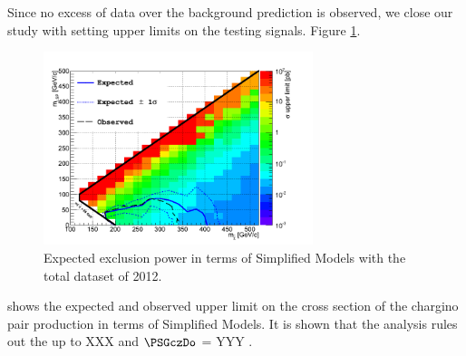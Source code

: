 Since no excess of data over the background prediction is observed, 
we close our study with setting upper limits on the testing signals.
Figure \ref{fig:limit_final}. 
\begin{linenomath}
\begin{figure}[h]
\centering
\includegraphics[width=0.7\textwidth,keepaspectratio=true]{StatisticsFig/Exclusion4Bins.png}
\caption{Expected exclusion power in terms of Simplified Models
with the total dataset of 2012. 
}
\label{fig:limit_final}
\end{figure}
\end{linenomath}
shows the expected and observed upper limit on the cross section of the chargino pair production in terms of Simplified Models.%
It is shown that the analysis rules out the \chione up to XXX \GeV and  $\PSGczDo$ = YYY \GeV.

